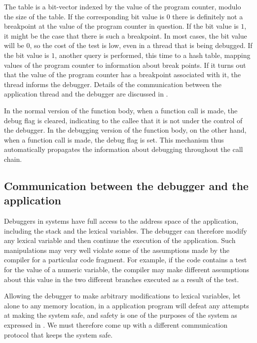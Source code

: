 The table is a bit-vector indexed by the value of the program counter,
modulo the size of the table.  If the corresponding bit value is $0$
there is definitely not a breakpoint at the value of the program
counter in question.  If the bit value is $1$, it might be the case
that there is such a breakpoint.  In most cases, the bit value will be
$0$, so the cost of the test is low, even in a thread that is being
debugged.  If the bit value is $1$, another query is performed, this
time to a hash table, mapping values of the program counter to
information about break points.  If it turns out that the value of the
program counter has a breakpoint associated with it, the thread
informs the debugger.  Details of the communication between the
application thread and the debugger are discussed in
.

In the normal version of the function body, when a function call is
made, the debug flag is cleared, indicating to the callee that it is
not under the control of the debugger.  In the debugging version of
the function body, on the other hand, when a function call is
made, the debug flag is set.  This mechanism thus automatically
propagates the information about debugging throughout the call chain.

\subsection{Communication between the debugger and the application}
\label{sec-debugger-application-communication}

Debuggers in \unix{} systems have full access to the address space of
the application, including the stack and the lexical variables.  The
debugger can therefore modify any lexical variable and then continue
the execution of the application.  Such manipulations may very well
violate some of the assumptions made by the compiler for a particular
code fragment.  For example, if the code contains a test for the value
of a numeric variable, the compiler may make different assumptions
about this value in the two different branches executed as a result of
the test.

Allowing the debugger to make arbitrary modifications to lexical
variables, let alone to any memory location, in a \commonlisp{}
application program will defeat any attempts at making the system
safe, and safety is one of the purposes of the \sicl{} system as
expressed in .  We must therefore come up
with a different communication protocol that keeps the system safe.

